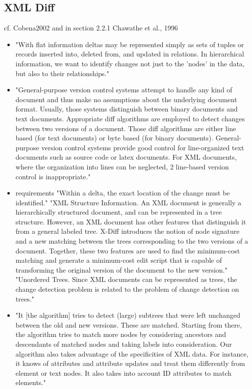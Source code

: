 	\subsection{XML Diff}
	cf. Cobena2002 \cite{Cobena2002} and \cite{Waltemath2013} in section 2.2.1
	Chawathe et al., 1996 \cite{Chawathe1996}
	\begin{itemize}
		\item "With flat information deltas may be represented simply as sets of tuples or records inserted into, deleted from, and updated in relations. In hierarchical information, we want to identify changes not just to the 'nodes' in the data, but also to their relationships." \cite{Chawathe1996}
		\item "General-purpose version control systems attempt to handle any kind of document and thus make no assumptions about the underlying document format. Usually, those systems distinguish between binary documents and text documents. Appropriate diff algorithms are employed to detect changes between two versions of a document. Those diff algorithms are either line based (for text documents) or byte based (for binary documents). General-purpose version control systems provide good control for line-organized text documents such as source code or latex documents. For XML documents, where the organization into lines can be neglected, 2 line-based version control is inappropriate." \cite{Ronnau2005}
		\item requirements
			\subitem "Within a delta, the exact location of the change must be identified." \cite{Ronnau2005}
			\subitem "XML Structure Information. An XML document is generally a hierarchically structured document, and can be represented in a tree structure. However, an XML document has other features that distinguish it from a general labeled tree. X-Diff introduces the	notion of node signature and a new matching between the trees corresponding to the two versions of a 	document. Together, these two features are used to find the minimum-cost matching and generate a minimum-cost edit script that is capable of transforming the original version of the document to the new version." \cite{Wang2003}
			\subitem "Unordered Trees. Since XML documents can be represented as trees, the change detection problem is related to the problem of change detection on trees." \cite{Wang2003}
		\item "It [the algorithm] tries to detect (large) subtrees that were left unchanged between the old and new versions. These are matched. Starting from there, the algorithm tries to match more nodes by considering ancestors and descendants of matched nodes and taking labels into consideration. Our algorithm also takes advantage of the specificities of XML data. For instance, it knows of attributes and attribute updates and treat them differently from element or text nodes. It also takes into account ID attributes to match elements." \cite{Cobena2002}
	\end{itemize}
	
